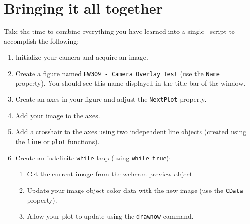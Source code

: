 \documentclass{tufte-handout}
\begin{document}
\section{Bringing it all together}
Take the time to combine everything you have learned into a single \Matlab\ script to accomplish the following:
\begin{enumerate}
\item Initialize your camera and acquire an image.
\item Create a figure named \lstinline{EW309 - Camera Overlay Test} (use the \lstinline{Name} property). You should see this name displayed in the title bar of the window. 
\item Create an axes in your figure and adjust the \lstinline{NextPlot} property.
\item Add your image to the axes.
\item Add a crosshair to the axes using two independent line objects (created using the \lstinline{line} or \lstinline{plot} functions).
\item Create an indefinite \lstinline{while} loop (using \lstinline{while true}):
\begin{enumerate}
\item Get the current image from the webcam preview object.
\item Update your image object color data with the new image (use the \lstinline{CData} property). 
\item Allow your plot to update using the \lstinline{drawnow} command.
\end{enumerate}
\end{enumerate}
\end{document}
